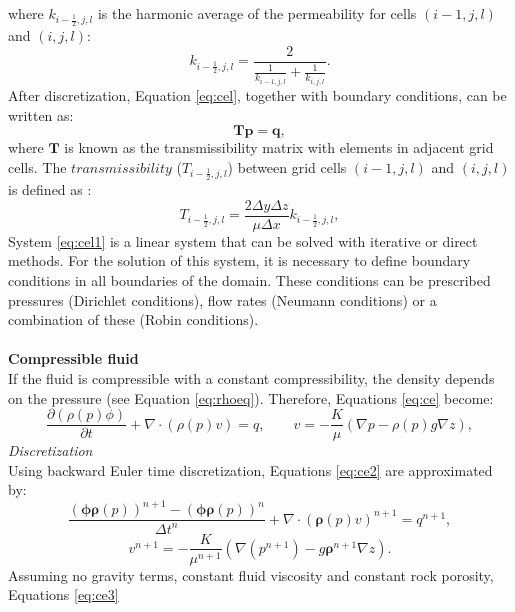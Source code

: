 \documentclass[review]{elsarticle}
\begin{document}
where $k_{i-\frac{1}{2},j,l}$ is the harmonic average of the permeability for cells 
$(i-1,j,l)$ and $(i,j,l)$:
\begin{equation}\label{eq:ha}
 k_{i-\frac{1}{2},j,l}=\frac{2}{\frac{1}{ k_{i-1,j,l}}+\frac{1}{ k_{i,j,l}}}.
\end{equation}
After discretization, Equation \eqref{eq:cel}, together with boundary conditions, can be written as:
 \begin{equation}\label{eq:cel1}
\mathbf{T}\mathbf{p} = \mathbf{q},
\end{equation}
where $\mathbf{T}$ is known as the transmissibility matrix with elements in adjacent grid cells. The $transmissibility$ ($T_{i-\frac{1}{2},j,l}$) between grid cells $(i-1,j,l)$ and $(i,j,l)$ is defined as \cite{Cordazzo02}:
\begin{equation}\label{eq:htrans}
 T_{i-\frac{1}{2},j,l}=\frac{2\Delta y \Delta z}{\mu\Delta x}k_{i-\frac{1}{2},j,l},
\end{equation} 
System \eqref{eq:cel1} is a linear system that can be solved with iterative or direct methods. For the solution of this system, it is necessary to define boundary conditions in all boundaries of the domain. These conditions can be prescribed pressures 
(Dirichlet conditions), flow rates (Neumann conditions) or a combination of these (Robin conditions).  \\\\
\textbf{Compressible fluid}\\
If the fluid is compressible with a constant compressibility, the density depends on the pressure (see Equation \eqref{eq:rhoeq}). Therefore, Equations \eqref{eq:ce} become:
\begin{equation}\label{eq:ce2}
\frac{\partial (\rho(p) \phi)}{\partial t}+ \nabla \cdot ( \rho(p) {v})=q, \qquad v=-\frac{K}{\mu}(\nabla p-\rho(p) g\nabla z),
\end{equation}
\emph{Discretization}\\
Using backward Euler time discretization, Equations \eqref{eq:ce2} are approximated by:
\begin{equation*}
 \frac{(\mathbf{\phi}\mathbf{\rho}(p))^{n+1}-(\mathbf{\phi}\mathbf{\rho}(p))^{n}}{\Delta t^n}
 +\nabla \cdot (\mathbf{\rho}({p}) v)^{n+1}={q}^{n+1},
\end{equation*}
\begin{equation}\label{eq:ce3}
{v}^{n+1}= -\frac{{K}}{\mu^{n+1}}(\nabla({p}^{n+1})-g\mathbf{\rho}^{n+1}\nabla{z}).
\end{equation}
Assuming no gravity terms, constant fluid viscosity and constant rock porosity, Equations \eqref{eq:ce3}
\end{document}
